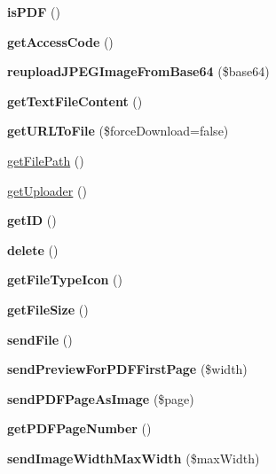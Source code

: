 \begin{DoxyCompactItemize}
{\bfseries is\+P\+DF} ()
\item 
\mbox{\label{class_file_upload_a3f96c9e57c98e9839c83fc8541b07c23}} 
{\bfseries get\+Access\+Code} ()
\item 
\mbox{\label{class_file_upload_a88119e98bf1ae69c533ba72fbdc316e1}} 
{\bfseries reupload\+J\+P\+E\+G\+Image\+From\+Base64} (\$base64)
\item 
\mbox{\label{class_file_upload_ac828f1d0c1cf80029239e674592bb8be}} 
{\bfseries get\+Text\+File\+Content} ()
\item 
\mbox{\label{class_file_upload_aa2fa0c1c1f697a9808c1eb9469628b46}} 
{\bfseries get\+U\+R\+L\+To\+File} (\$force\+Download=false)
\item 
\mbox{\hyperlink{class_file_upload_a12fffe7962e60e59daab147c0e34efc6}{get\+File\+Path}} ()
\item 
\mbox{\hyperlink{class_file_upload_a77c25f605403b1c0650b109ff431f5c8}{get\+Uploader}} ()
\item 
\mbox{\label{class_file_upload_a3ebfe5d914277b0792b2c9837caaebbc}} 
{\bfseries get\+ID} ()
\item 
\mbox{\label{class_file_upload_a1d9649f33a5d40a0794957d3aba08ec7}} 
{\bfseries delete} ()
\item 
\mbox{\label{class_file_upload_aa0377714a65aa3dad35fc3bf869fef7b}} 
{\bfseries get\+File\+Type\+Icon} ()
\item 
\mbox{\label{class_file_upload_a9831125662b514443bb4df3d9ef9f56f}} 
{\bfseries get\+File\+Size} ()
\item 
\mbox{\label{class_file_upload_af2e909756495d4c3ab5fc8e005fa1e5e}} 
{\bfseries send\+File} ()
\item 
\mbox{\label{class_file_upload_a10ef370dfb8e9daa367fa5aa5ffc590d}} 
{\bfseries send\+Preview\+For\+P\+D\+F\+First\+Page} (\$width)
\item 
\mbox{\label{class_file_upload_a7854fbee0f7966aaf1697e9a9eea9d35}} 
{\bfseries send\+P\+D\+F\+Page\+As\+Image} (\$page)
\item 
\mbox{\label{class_file_upload_a0a8ee98e6f35c75f34d35787c20668a3}} 
{\bfseries get\+P\+D\+F\+Page\+Number} ()
\item 
\mbox{\label{class_file_upload_aa2d6d1b8f6fb42ae6cc8d0f0e6d0c6b1}} 
{\bfseries send\+Image\+Width\+Max\+Width} (\$max\+Width)
\end{DoxyCompactItemize}
